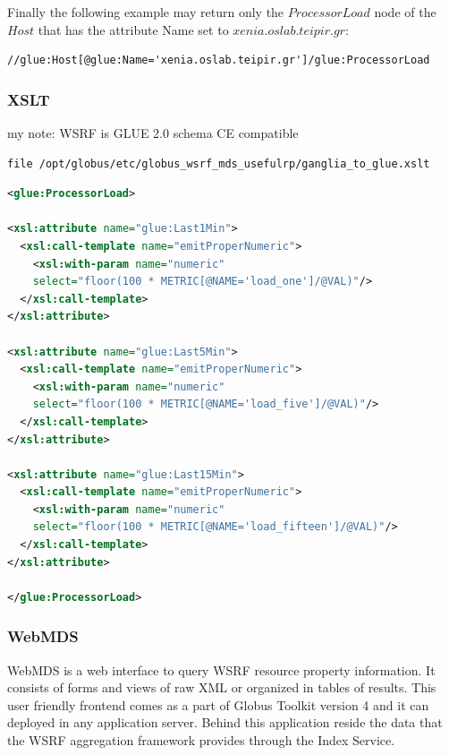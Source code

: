 Finally the following example may return only the $ProcessorLoad$ node of the $Host$ that has the attribute Name set to $xenia.oslab.teipir.gr$:
\begin{verbatim}
//glue:Host[@glue:Name='xenia.oslab.teipir.gr']/glue:ProcessorLoad
\end{verbatim}

\newpage

\subsubsection{XSLT}
my note: WSRF is GLUE 2.0 schema CE compatible
\begin{verbatim}
file /opt/globus/etc/globus_wsrf_mds_usefulrp/ganglia_to_glue.xslt
\end{verbatim}

\begin{lstlisting}[language=XML,caption=WSRF XSLT for Ganglia Information Provider]
<glue:ProcessorLoad>

<xsl:attribute name="glue:Last1Min">
  <xsl:call-template name="emitProperNumeric">
    <xsl:with-param name="numeric" 
    select="floor(100 * METRIC[@NAME='load_one']/@VAL)"/>
  </xsl:call-template>
</xsl:attribute>

<xsl:attribute name="glue:Last5Min">
  <xsl:call-template name="emitProperNumeric">
    <xsl:with-param name="numeric" 
    select="floor(100 * METRIC[@NAME='load_five']/@VAL)"/>
  </xsl:call-template>
</xsl:attribute>

<xsl:attribute name="glue:Last15Min">
  <xsl:call-template name="emitProperNumeric">
    <xsl:with-param name="numeric" 
    select="floor(100 * METRIC[@NAME='load_fifteen']/@VAL)"/>
  </xsl:call-template>
</xsl:attribute>

</glue:ProcessorLoad>
\end{lstlisting}
\newpage

\subsubsection{WebMDS}
WebMDS is a web interface to query WSRF resource property information. It consists of forms and views of raw XML or organized in tables of results. This user friendly frontend comes as a part of Globus Toolkit version 4 and it can deployed in any application server. Behind this application reside the data that the WSRF aggregation framework provides through the Index Service.

